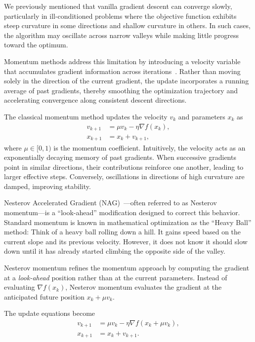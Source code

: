 We previously mentioned that vanilla gradient descent can converge slowly, particularly in ill-conditioned problems where the objective function exhibits steep curvature in some directions and shallow curvature in others. In such cases, the algorithm may oscillate across narrow valleys while making little progress toward the optimum.


Momentum methods address this limitation by introducing a velocity variable that accumulates gradient information across iterations~\cite{polyak1964some}. Rather than moving solely in the direction of the current gradient, the update incorporates a running average of past gradients, thereby smoothing the optimization trajectory and accelerating convergence along consistent descent directions.

The classical momentum method updates the velocity $v_k$ and parameters $x_k$ as
\begin{align*}
v_{k+1} &= \mu v_k - \eta \nabla f(x_k), \\
x_{k+1} &= x_k + v_{k+1},
\end{align*}
where $\mu \in [0,1)$ is the momentum coefficient. Intuitively, the velocity acts as an exponentially decaying memory of past gradients. When successive gradients point in similar directions, their contributions reinforce one another, leading to larger effective steps. Conversely, oscillations in directions of high curvature are damped, improving stability.

Nesterov Accelerated Gradient (NAG)~\cite{nesterov1983method}---often referred to as Nesterov momentum---is a ``look-ahead'' modification designed to correct this behavior. Standard momentum is known in mathematical optimization as the ``Heavy Ball'' method: Think of a heavy ball rolling down a hill. It gains speed based on the current slope and its previous velocity. However, it does not know it should slow down until it has already started climbing the opposite side of the valley.

Nesterov momentum refines the momentum approach by computing the gradient at a {\em look-ahead} position rather than at the current parameters. Instead of evaluating $\nabla f(x_k)$, Nesterov momentum evaluates the gradient at the anticipated future position $x_k + \mu v_k$.

The update equations become
\begin{align*}
v_{k+1} &= \mu v_k - \eta \nabla f(x_k + \mu v_k), \\
x_{k+1} &= x_k + v_{k+1}.
\end{align*}

